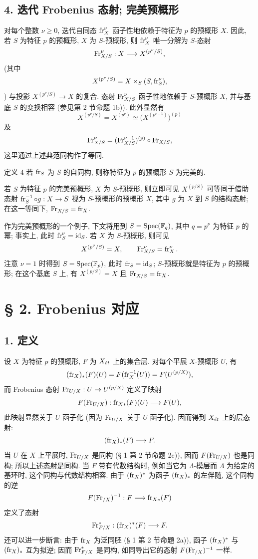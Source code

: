 \subsection*{4. 迭代 Frobenius 态射; 完美预概形}

对每个整数 $\nu\geq0$, 迭代自同态 $\operatorname{fr}_X^\nu$ 函子性地依赖于特征为 $p$ 的预概形 $X$. 因此, 若 $S$ 为特征 $p$ 的预概形, $X$ 为 $S$-预概形, 则 $\operatorname{fr}_X^\nu$ 唯一分解为 $S$-态射
\[
\operatorname{Fr}_{X/S}^\nu:X\longrightarrow X^{(p^\nu/S)},
\]
(其中
\[
X^{(p^\nu/S)}=X\times_S(S,\operatorname{fr}_S^\nu),
\]
) 与投影 $X^{(p^\nu/S)}\to X$ 的复合. 态射 $\operatorname{Fr}_{X/S}^\nu$ 函子性地依赖于 $S$-预概形 $X$, 并与基底 $S$ 的变换相容 (参见第 2 节命题 1b)). 此外显然有
\[
X^{(p^\nu/S)}=X^{(p^\nu)}\simeq\bigl(X^{(p^{\nu-1})}\bigr)^{(p)}
\]
及
\[
\operatorname{Fr}_{X/S}^\nu=(\operatorname{Fr}_{X/S}^{\nu-1})^{(p)}\circ\operatorname{Fr}_{X/S},
\]
这里通过上述典范同构作了等同.

\begin{statement}{定义 4}
若 $\operatorname{fr}_S$ 为 $S$ 的自同构, 则称特征为 $p$ 的预概形 $S$ 为完美的.
\end{statement}

若 $S$ 为特征 $p$ 的完美预概形, $X$ 为 $S$-预概形, 则立即可见 $X^{(p/S)}$ 可等同于借助态射 $\operatorname{fr}_S^{-1}\circ g:X\to S$ 视为 $S$-预概形的预概形 $X$, 其中 $g$ 为 $X$ 到 $S$ 的结构态射; 在这一等同下, $\operatorname{Fr}_{X/S}=\operatorname{fr}_X$.

作为完美预概形的一个例子, 下文将用到 $S=\operatorname{Spec}(\mathbb F_q)$, 其中 $q=p^\nu$ 为特征 $p$ 的幂; 事实上, 此时 $\operatorname{fr}_S^\nu=\operatorname{id}_S$. 若 $X$ 为 $S$-预概形, 则可见
\[
X^{(p^\nu/S)}=X,
\qquad
\operatorname{Fr}_{X/S}^\nu=\operatorname{fr}_X^\nu.
\]
注意 $\nu=1$ 时得到 $S=\operatorname{Spec}(\mathbb F_p)$, 此时 $\operatorname{fr}_S=\operatorname{id}_S$; $S$-预概形就是特征为 $p$ 的预概形; 在这个基底 $S$ 上, 有 $X^{(p/S)}=X$ 且 $\operatorname{Fr}_{X/S}=\operatorname{fr}_X$.

\section*{§ 2. Frobenius 对应}

\subsection*{1. 定义}

设 $X$ 为特征 $p$ 的预概形, $F$ 为 $X_{\acute{e}t}$ 上的集合层. 对每个平展 $X$-预概形 $U$, 有
\[
(\operatorname{fr}_X)_*(F)(U)=F(\operatorname{fr}_X^{-1}(U))=F(U^{(p/X)}),
\]
而 Frobenius 态射 $\operatorname{Fr}_{U/X}:U\to U^{(p/X)}$ 定义了映射
\[
F(\operatorname{Fr}_{U/X}):\operatorname{fr}_{X*}(F)(U)\longrightarrow F(U),
\]
此映射显然关于 $U$ 函子化 (因为 $\operatorname{Fr}_{U/X}$ 关于 $U$ 函子化). 因而得到 $X_{\acute{e}t}$ 上的层态射:
\[
(\operatorname{fr}_X)_*(F)\longrightarrow F.
\]
当 $U$ 在 $X$ 上平展时, $\operatorname{Fr}_{U/X}$ 是同构 (§ 1 第 2 节命题 2c)), 因而 $F(\operatorname{Fr}_{U/X})$ 也是同构; 所以上述态射是同构. 当 $F$ 带有代数结构时, 例如当它为 $\Lambda$-模层而 $\Lambda$ 为给定的基环时, 这个同构与代数结构相容. 由于 $(\operatorname{fr}_X)^*$ 为函子 $(\operatorname{fr}_X)_*$ 的左伴随, 这个同构的逆
\[
F(\operatorname{Fr}_{/X})^{-1}:F\longrightarrow \operatorname{fr}_{X*}(F)
\]
定义了态射
\[
\operatorname{Fr}^*_{F/X}:(\operatorname{fr}_X)^*(F)\longrightarrow F.
\]
还可以进一步断言: 由于 $\operatorname{fr}_X$ 为泛同胚 (§ 1 第 2 节命题 2a)), 函子 $(\operatorname{fr}_X)^*$ 与 $(\operatorname{fr}_X)_*$ 互为拟逆; 因而 $\operatorname{Fr}^*_{F/X}$ 是同构, 如同导出它的态射 $F(\operatorname{Fr}_{/X})^{-1}$ 一样.

